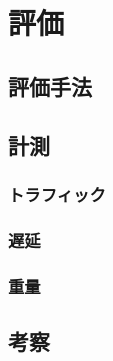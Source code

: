 \chapter{評価}
\label{chap:evaluation}

\section{評価手法}

\section{計測}

\subsection{トラフィック}

\subsection{遅延}

\subsection{重量}

\section{考察}
